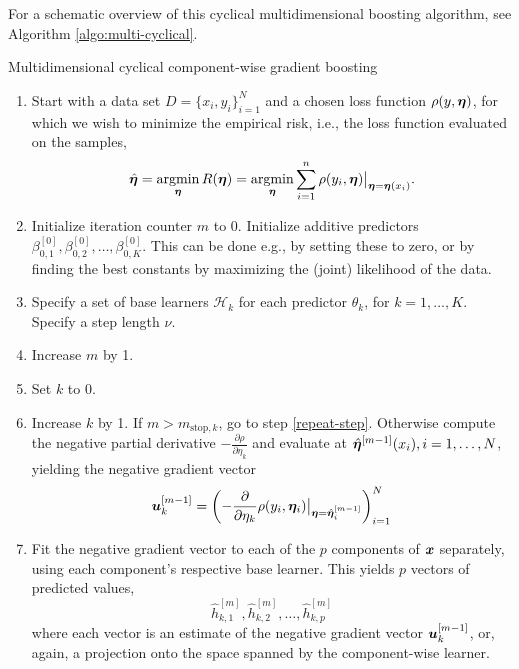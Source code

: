 For a schematic overview of this cyclical multidimensional boosting algorithm, see Algorithm \ref{algo:multi-cyclical}.
\begin{algorithm}
\caption{Multidimensional cyclical component-wise gradient boosting}
\label{algo:multi-cyclical}
\begin{enumerate}
    \item Start with a data set $D=\{x_i, y_i\}_{i=1}^N$ and a chosen loss function $\rho(y,\boldsymbol{\eta})$, for which we wish to
        minimize the empirical risk, i.e., the loss function evaluated on the samples,
        \begin{equation}
            \hat{\boldsymbol{\eta}}=\operatorname*{argmin}_{\boldsymbol{\eta}}R(\boldsymbol{\eta})=\operatorname*{argmin}_{\boldsymbol{\eta}}\sum_{i=1}^n \rho(y_i,\boldsymbol{\eta})\big\rvert_{\boldsymbol{\eta}=\boldsymbol{\eta}(x_i)}.
        \end{equation}
    \item Initialize iteration counter $m$ to 0. Initialize additive predictors $\beta_{0,1}^{[0]},\beta_{0,2}^{[0]},\ldots,\beta_{0,K}^{[0]}$. This can be done e.g., by setting these to zero, or by finding the best constants by maximizing the (joint) likelihood of the data.
    \item\label{initialization} Specify a set of base learners $\mathcal{H}_k$ for each predictor $\theta_k$, for $k=1,\ldots,K$. Specify a step length $\nu$.
    \item Increase $m$ by 1.
    \item Set $k$ to 0.
    \item\label{cyclic-first} Increase $k$ by 1. If $m>m_{\text{stop},k}$, go to step \ref{repeat-step}. Otherwise compute the negative partial derivative
        $-\frac{\partial\rho}{\partial \eta_k}$ and evaluate at $\hat{\boldsymbol{\eta}}^{[m-1]}(x_i),i=1,\ldots,N$, yielding the
        negative gradient vector
        \begin{equation}
            \bm{u}^{[m-1]}_k=\left(-\frac{\partial}{\partial \eta_k}\rho(y_i, \boldsymbol{\eta}_i)\big\rvert_{\boldsymbol{\eta}=\hat{\boldsymbol{\eta}}_{i}^{[m-1]}}\right)_{i=1}^N
        \end{equation}
    \item Fit the negative gradient vector to each of the $p$ components of $\bm{x}$ separately, using each component's respective base learner. This yields $p$ vectors of predicted values,
        \begin{equation}
            \hat{h}_{k,1}^{[m]},\hat{h}_{k,2}^{[m]},\ldots,\hat{h}_{k,p}^{[m]}
        \end{equation}
        where each vector is an estimate of the negative gradient vector $\bm{u}^{[m-1]}_k$, or, again, a projection onto the space spanned by the component-wise learner.

\end{enumerate}
\end{algorithm}
